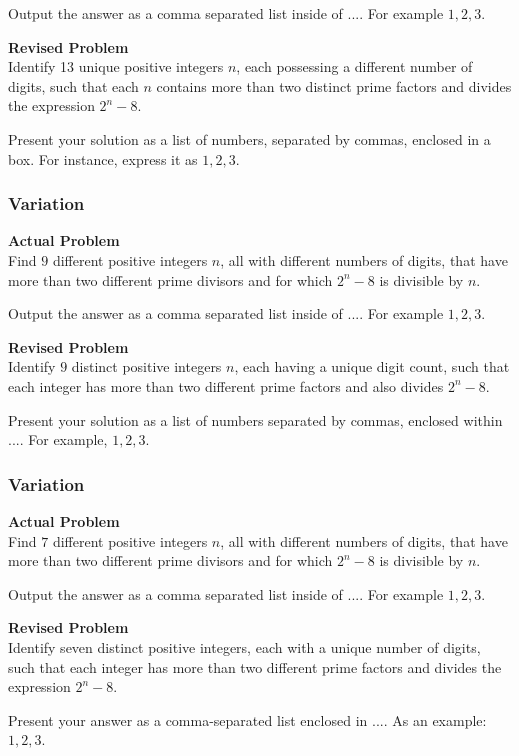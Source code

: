 Output the answer as a comma separated list inside of $\boxed{...}$. For example $\boxed{1, 2, 3}$.

\textbf{Revised Problem}\\
Identify 13 unique positive integers \( n \), each possessing a different number of digits, such that each \( n \) contains more than two distinct prime factors and divides the expression \( 2^n - 8 \).

Present your solution as a list of numbers, separated by commas, enclosed in a box. For instance, express it as \(\boxed{1, 2, 3}\).

\subsubsection{Variation}
\textbf{Actual Problem}\\
Find $9$ different positive integers $n$, all with different numbers of digits, that have more than two different prime divisors and for which $2^n - 8$ is divisible by $n$.

Output the answer as a comma separated list inside of $\boxed{...}$. For example $\boxed{1, 2, 3}$.

\textbf{Revised Problem}\\
Identify $9$ distinct positive integers $n$, each having a unique digit count, such that each integer has more than two different prime factors and also divides $2^n - 8$.

Present your solution as a list of numbers separated by commas, enclosed within $\boxed{...}$. For example, $\boxed{1, 2, 3}$.

\subsubsection{Variation}
\textbf{Actual Problem}\\
Find $7$ different positive integers $n$, all with different numbers of digits, that have more than two different prime divisors and for which $2^n - 8$ is divisible by $n$.

Output the answer as a comma separated list inside of $\boxed{...}$. For example $\boxed{1, 2, 3}$.

\textbf{Revised Problem}\\
Identify seven distinct positive integers, each with a unique number of digits, such that each integer has more than two different prime factors and divides the expression $2^n - 8$.

Present your answer as a comma-separated list enclosed in $\boxed{...}$. As an example: $\boxed{1, 2, 3}$.

